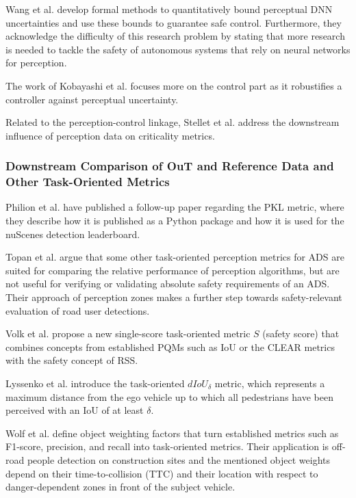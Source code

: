 \documentclass[conference]{IEEEtran}
\newcommand{\new}[1]{{\color{my-red}#1}}
\begin{document}
Wang et al. \cite{Wang2021bounding} develop formal methods to quantitatively bound perceptual DNN uncertainties and use these bounds to guarantee safe control. 
Furthermore, they acknowledge the difficulty of this research problem by stating that more research is needed to tackle the safety of autonomous systems that rely on neural networks for perception. 

The work of Kobayashi et al. \cite{Kobayashi2021} focuses more on the control part as it robustifies a controller against perceptual uncertainty.


Related to the perception-control linkage, Stellet et al. \cite{Stellet2015propagation} address the downstream influence of perception data on criticality metrics.



\subsubsection{Downstream Comparison of \new{OuT} and Reference Data \new{and Other Task-Oriented Metrics}}
\label{sec:downstream_comparison}

Philion et al. \cite{Philion2020implementingPKL} have published a follow-up paper regarding the PKL metric, where they describe how it is published as a Python package and how it is used for the nuScenes detection leaderboard.

Topan et al. \cite{Topan2022zones} argue that some other task-oriented perception metrics for ADS are suited for comparing the relative performance of perception algorithms, but are not useful for verifying or validating absolute safety requirements of an ADS. Their approach of perception zones makes a further step towards safety-relevant evaluation of road user detections.

Volk et al. \cite{Volk2020metric} propose a new single-score task-oriented metric $S$ (safety score) that combines concepts from established PQMs such as IoU or the CLEAR metrics with the safety concept of RSS. 

Lyssenko et al. \cite{Lyssenko2021relevance} introduce the task-oriented $dIoU_\delta$ metric, which represents a maximum distance from the ego vehicle up to which all pedestrians have been perceived with an IoU of at least $\delta$. 

Wolf et al. \cite{Wolf2021people} define object weighting factors that turn established metrics such as F1-score, precision, and recall into task-oriented metrics. 
Their application is off-road people detection on construction sites and the mentioned object weights depend on their time-to-collision (TTC) and their location with respect to danger-dependent zones in front of the subject vehicle. 
\end{document}
